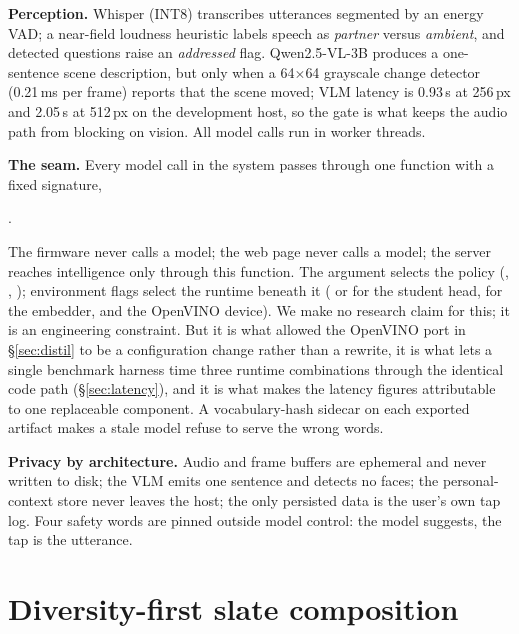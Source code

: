 \textbf{Perception.} Whisper  \citep{whisper} (INT8) transcribes utterances
segmented by an energy VAD; a near-field loudness heuristic labels speech as
\emph{partner} versus \emph{ambient}, and detected questions raise an
\emph{addressed} flag. Qwen2.5-VL-3B \citep{qwen25vl} produces a one-sentence
scene description, but only when a 64$\times$64 grayscale change detector
(0.21\,ms per frame) reports that the scene moved; VLM latency is 0.93\,s at 256\,px
and 2.05\,s at 512\,px on the development host, so the gate is what keeps the
audio path from blocking on vision. All model calls run in worker threads.

\textbf{The seam.} Every model call in the system passes through one function
with a fixed signature,
\begin{center}
.
\end{center}
The firmware never calls a model; the web page never calls a model; the server
reaches intelligence only through this function. The  argument
selects the policy (, , ); environment flags
select the runtime beneath it ( or  for the student
head, for the embedder, and the OpenVINO device). We make no research claim for
this; it is an engineering constraint. But it is what allowed the OpenVINO port
in \S\ref{sec:distil} to be a configuration change rather than a rewrite, it is
what lets a single benchmark harness time three runtime combinations through
the identical code path (\S\ref{sec:latency}), and it is what makes the latency
figures attributable to one replaceable component. A vocabulary-hash sidecar on
each exported artifact makes a stale model refuse to serve the wrong words.

\textbf{Privacy by architecture.} Audio and frame buffers are ephemeral and
never written to disk; the VLM emits one sentence and detects no faces; the
personal-context store never leaves the host; the only persisted data is the
user's own tap log. Four safety words are pinned outside model control: the
model suggests, the tap is the utterance.

\section{Diversity-first slate composition}\label{sec:slate}

